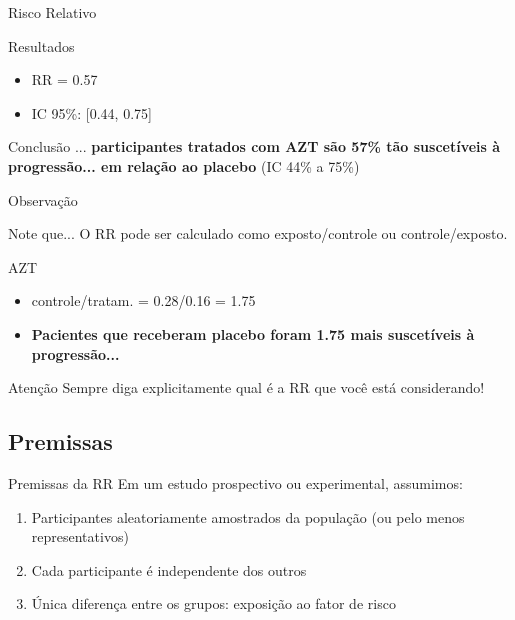 \documentclass{beamer}
\begin{document}
\begin{frame}{Risco Relativo}
  \begin{exampleblock}{Resultados}
    \begin{itemize}
    \item RR = 0.57
    \item IC 95\%: [0.44, 0.75]
    \end{itemize}
  \end{exampleblock}

  \bigskip
  \begin{exampleblock}{Conclusão}
    ... {\bf participantes tratados com AZT são 57\% tão suscetíveis à progressão... em relação ao placebo} (IC 44\% a 75\%)
  \end{exampleblock}
\end{frame}

\begin{frame}{Observação}
  \begin{block}{Note que...}
    O RR pode ser calculado como exposto/controle ou controle/exposto.
  \end{block}
  \begin{exampleblock}{AZT}
    \begin{itemize}
    \item controle/tratam. = 0.28/0.16 = 1.75
    \item {\bf Pacientes que receberam placebo foram 1.75 mais suscetíveis à progressão...}
    \end{itemize}
  \end{exampleblock}
  \begin{block}{Atenção}
    Sempre diga explicitamente qual é a RR que você está considerando!
  \end{block}
\end{frame}

\subsection{Premissas}

\begin{frame}{Premissas da RR}
  Em um estudo prospectivo ou experimental, assumimos:
  \begin{enumerate}
  \item Participantes aleatoriamente amostrados da população (ou pelo menos representativos)
  \item Cada participante é independente dos outros
  \item Única diferença entre os grupos: exposição ao fator de risco
  \end{enumerate}
\end{frame}
\end{document}
